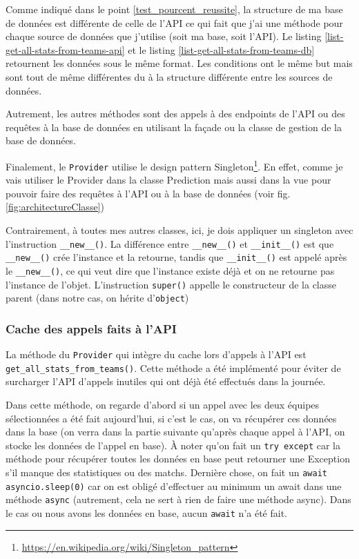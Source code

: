 \documentclass[a4paper,14pt]{extarticle}
\begin{document}
{\newpage


Comme indiqué dans le point \ref{test_pourcent_reussite}, la structure de ma base de données est différente de celle de l'API ce qui fait que j'ai une méthode pour chaque source de données que j'utilise (soit ma base, soit l'API). Le listing \ref{list-get-all-stats-from-teams-api} et le listing \ref{list-get-all-stats-from-teams-db} retournent les données sous le même format. Les conditions ont le même but mais sont tout de même différentes du à la structure différente entre les sources de données. 

Autrement, les autres méthodes sont des appels à des endpoints de l'API ou des requêtes à la base de données en utilisant la façade ou la classe de gestion de la base de données.

Finalement, le \texttt{Provider} utilise le design pattern Singleton\footnote{\url{https://en.wikipedia.org/wiki/Singleton_pattern}}. En effet, comme je vais utiliser le Provider dans la classe Prediction mais aussi dans la vue pour pouvoir faire des requêtes à l'API ou à la base de données (voir fig. \ref{fig:architectureClasse})


Contrairement, à toutes mes autres classes, ici, je dois appliquer un singleton avec l'instruction \texttt{\_\_new\_\_()}. La différence entre \texttt{\_\_new\_\_()} et \texttt{\_\_init\_\_()} est que \texttt{\_\_new\_\_()} crée l'instance et la retourne, tandis que \texttt{\_\_init\_\_()} est appelé après le \texttt{\_\_new\_\_()}, ce qui veut dire que l'instance existe déjà et on ne retourne pas l'instance de l'objet. L'instruction \texttt{super()} appelle le constructeur de la classe parent (dans notre cas, on hérite d'\texttt{object})

\subsubsection{Cache des appels faits à l'API}

La méthode du \texttt{Provider} qui intègre du cache lors d'appels à l'API est \texttt{get\_all\_stats\_from\_teams()}. Cette méthode a été implémenté pour éviter de surcharger l'API d'appels inutiles qui ont déjà été effectués dans la journée.


Dans cette méthode, on regarde d'abord si un appel avec les deux équipes sélectionnées a été fait aujourd'hui, si c'est le cas, on va récupérer ces données dans la base (on verra dans la partie suivante qu'après chaque appel à l'API, on stocke les données de l'appel en base). À noter qu'on fait un \texttt{try except} car la méthode pour récupérer toutes les données en base peut retourner une Exception s'il manque des statistiques ou des matchs. Dernière chose, on fait un \texttt{await asyncio.sleep(0)} car on est obligé d'effectuer au minimum un await dans une méthode \texttt{async} (autrement, cela ne sert à rien de faire une méthode async). Dans le cas ou nous avons les données en base, aucun \texttt{await} n'a été fait.

}
\end{document}
